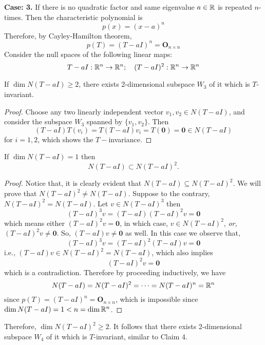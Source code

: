 \documentclass[11pt, a4paper, abstract=true]{scrartcl}
\begin{document}
\begin{soln}
    \noindent\textbf{Case: 3.} If there is no quadratic factor and same eigenvalue \(a \in \mathbb R\) is repeated \(n\)-times. Then the characteristic polynomial is \[p(x) = (x - a)^n\]
    Therefore, by Cayley-Hamilton theorem, \[p(T) = (T - aI)^n = \mathbf{O}_{n\times n}\]
    Consider the null spaces of the following linear maps: \[T - aI : \mathbb R^n \to \mathbb R^n; \quad (T - a I)^2 : \mathbb R^n \to \mathbb R^n\]
    \begin{claim*}[4]
        If \(\dim N(T-aI) \geq 2\), there exists 2-dimensional subspace \(W_3\) of it which is \(T\)-invariant.
    \end{claim*}
    \begin{proof}
        Choose any two linearly independent vector \(v_1, v_2 \in N(T-aI)\), and consider the subspace \(W_3\) spanned by \(\{v_1, v_2\}\). Then \[(T-aI)T(v_i) = T(T-aI)v_i = T(\mathbf{0}) =  \mathbf{0}\in N(T-aI)\] for \(i =1,2\), which shows the \(T-\)invariance.
    \end{proof}
    \begin{claim*}[5]
        If \(\dim N(T-aI) = 1\) then
        \[N(T - a I) \subset N(T-a I)^2 .\] 
        
    \end{claim*}
    \begin{proof}
        Notice that, it is clearly evident that \(N(T - aI) \subseteq N(T-a I)^2\). We will prove that \(N(T-aI)^2 \neq N(T - aI)\). Suppose to the contrary, \(N(T-aI)^2 = N(T - aI)\). Let \(v \in N(T-aI)^3\) then \[(T-aI)^3v = (T-aI)(T-aI)^2v = \mathbf{0}\]
        which means either \((T-aI)^2v = \mathbf{0}\), in which case, \(v \in N(T-aI)^2\), \emph{or,} \((T-aI)^2v \neq \mathbf{0}\). So, \((T-aI)v \neq \mathbf{0}\) as well. In this case we observe that, \[(T-aI)^3v = (T-aI)^2(T-aI)v = \mathbf{0}\] i.e., \((T-aI)v \in N(T-aI)^2 = N(T-aI)\), which also implies \[(T-aI)^2v = \mathbf{0}\] which is a contradiction. Therefore by proceeding inductively, we have \[N(T-aI) = N(T-aI)^2 = \dots = N(T-aI)^n = \mathbb R^n\] since \(p(T) = (T-aI)^n = \mathbf{O}_{n\times n}\), which is impossible since \(\dim N(T-aI) = 1 < n = \dim \mathbb R^n\).
    \end{proof}
    Therefore, \(\dim N(T-aI)^2 \geq 2\). It follows that there exists 2-dimensional subspace \(W_4\) of it which is \(T\)-invariant, similar to Claim 4.
\end{soln}
\end{document}
